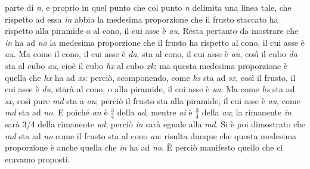 \documentclass[11pt,twoside,openany]{book}
\begin{document}
parte di \emph{n}, e proprio in quel punto che col punto \emph{n} delimita una linea tale, che rispetto ad essa \emph{in} abbia la medesima proporzione che il frusto staccato ha rispetto alla piramide o al cono, il cui asse è \emph{au}. Resta pertanto da mostrare che \emph{in} ha ad \emph{no} la medesima proporzione che il frusto ha rispetto al cono, il cui asse è \emph{au}. Ma come il cono, il cui asse è \emph{da}, sta al cono, il cui asse è \emph{au}, così il cubo \emph{da} sta al cubo \emph{au}, cioè il cubo \emph{hx} al cubo \emph{xk}: ma questa medesima proporzione è quella che \emph{hx} ha ad \emph{xs}: perciò, scomponendo, come \emph{hs} sta ad \emph{sx}, così il frusto, il cui asse è \emph{du}, starà al cono, o alla piramide, il cui asse è \emph{ua}. Ma come \emph{hs} sta ad \emph{sx}, così pure \emph{md} sta a \emph{on}; perciò il frusto sta alla piramide, il cui asse è \emph{au}, come \emph{md} sta ad \emph{no}. E poiché \emph{an} è $\frac{3}{4}$ della \emph{ad}, mentre \emph{ai} è $\frac{3}{4}$ della \emph{au}; la rimanente \emph{in} sarà 3/4 della rimanente \emph{ud}; perciò \emph{in} sarà eguale alla \emph{md}. Si è poi dimostrato che \emph{md} sta ad \emph{no} come il frusto sta al cono \emph{au}: risulta dunque che questa medesima proporzione è anche quella che \emph{in} ha ad \emph{no}. È perciò manifesto quello che ci eravamo proposti.
\end{document}
